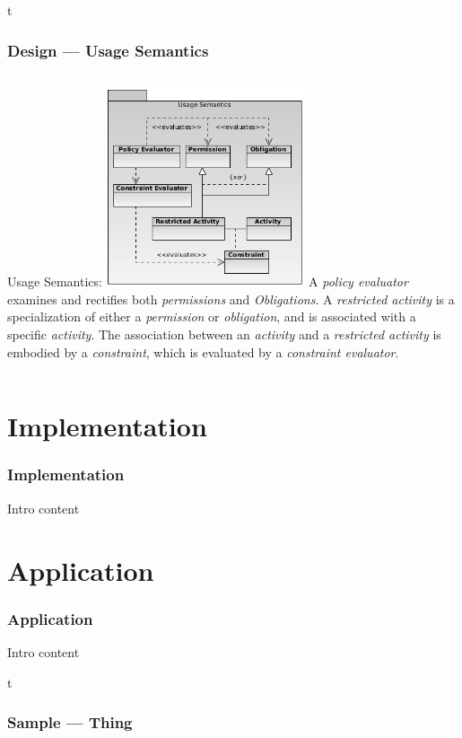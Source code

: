 \documentclass[t, 10pt]{beamer}
\begin{document}
\begin{frame}{t}
\frametitle{Design --- Usage Semantics}
\begin{columns}[t]
Usage Semantics:
\includegraphics[width=2.3in]{usage-semantics}
\pause
A \textit{policy evaluator} examines and rectifies both \textit{permissions} and \textit{Obligations}.
\newline
\newline
\pause
A \textit{restricted activity} is a specialization of either a \textit{permission} or \textit{obligation}, and is associated with a specific \textit{activity}.
\newline
\newline
\pause
The association between an \textit{activity} and a \textit{restricted activity} is embodied by a \textit{constraint}, which is evaluated by a \textit{constraint evaluator}.
\end{columns}
\end{frame}

\section{Implementation}
\begin{frame}[t]
\frametitle{Implementation}
Intro content
\end{frame}

\section{Application}
\begin{frame}[t]
\frametitle{Application}
Intro content
\end{frame}

\begin{frame}{t}
\frametitle{Sample --- Thing}
\begin{columns}[t]
\end{columns}
\end{frame}
\end{document}
